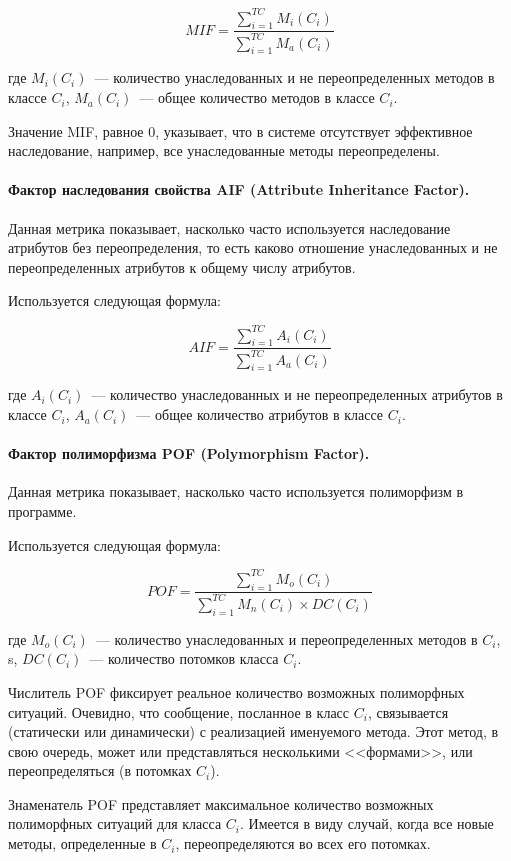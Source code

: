 \documentclass{../../text-style}
\begin{document}
$$MIF = \frac{\sum\limits_{i=1}^{TC}M_i(C_i)}{\sum\limits_{i=1}^{TC}M_a(C_i)}$$

где $M_i(C_i)$~--- количество унаследованных и не переопределенных методов в классе $C_i$, $M_a(C_i)$~--- общее количество методов в классе $C_i$.

Значение MIF, равное 0, указывает, что в системе отсутствует эффективное наследование, например, все унаследованные методы переопределены.

\paragraph{Фактор наследования свойства AIF (Attribute Inheritance Factor).} Данная метрика показывает, насколько часто используется наследование атрибутов без переопределения, то есть каково отношение унаследованных и не переопределенных атрибутов к общему числу атрибутов.

Используется следующая формула:

$$AIF = \frac{\sum\limits_{i=1}^{TC}A_i(C_i)}{\sum\limits_{i=1}^{TC}A_a(C_i)}$$

где $A_i(C_i)$~--- количество унаследованных и не переопределенных атрибутов в классе $C_i$, $A_a(C_i)$~--- общее количество атрибутов в классе $C_i$.

\paragraph{Фактор полиморфизма POF (Polymorphism Factor).} 
Данная метрика показывает, насколько часто используется полиморфизм в программе.

Используется следующая формула:

$$POF = \frac{\sum\limits_{i=1}^{TC}M_o(C_i)}{\sum\limits_{i=1}^{TC}M_n(C_i) \times DC(C_i)}$$

где $M_o(C_i)$~--- количество унаследованных и переопределенных методов в $C_i$, s, $DC(C_i)$~--- количество потомков класса $C_i$.

Числитель POF фиксирует реальное количество возможных полиморфных ситуаций. Очевидно, что сообщение, посланное в класс $C_i$, связывается (статически или динамически) с реализацией именуемого метода. Этот метод, в свою очередь, может или представляться несколькими <<формами>>, или переопределяться (в потомках $C_i$).

Знаменатель POF представляет максимальное количество возможных полиморфных ситуаций для класса $C_i$. Имеется в виду случай, когда все новые методы, определенные в $C_i$, переопределяются во всех его потомках.
\end{document}
